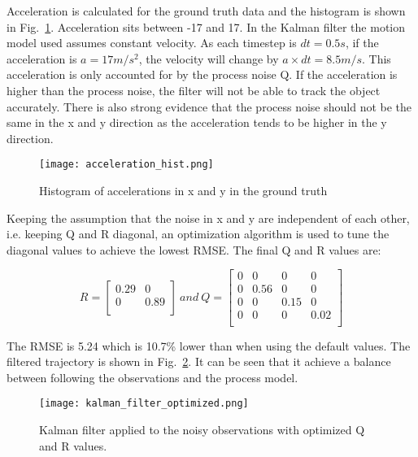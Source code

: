 \documentclass{report}
\begin{document}
Acceleration is calculated for the ground truth data and the histogram is shown in Fig.~\ref{fig:acceleration_hist}. Acceleration sits between -17 and 17. In the Kalman filter the motion model used assumes constant velocity. As each timestep is \(dt=0.5s\), if the acceleration is \(a = 17 m/s^2\), the velocity will change by \(a \times dt = 8.5m/s\). This acceleration is only accounted for by the process noise Q. If the acceleration is higher than the process noise, the filter will not be able to track the object accurately. There is also strong evidence that the process noise should not be the same in the x and y direction as the acceleration tends to be higher in the y direction.

\begin{figure}
    \centering
    \texttt{[image: acceleration\_hist.png]}
    \caption{Histogram of accelerations in x and y in the ground truth}
    \label{fig:acceleration_hist}
\end{figure}

Keeping the assumption that the noise in x and y are independent of each other, i.e. keeping Q and R diagonal, an optimization algorithm is used to tune the diagonal values to achieve the lowest RMSE. The final Q and R values are:

\begin{equation}
R = \begin{bmatrix} 
    0.29 & 0    \\
    0    & 0.89 \\
\end{bmatrix}\ and\ Q = \begin{bmatrix} 
    0 & 0    & 0    & 0    \\
    0 & 0.56 & 0    & 0    \\
    0 & 0    & 0.15 & 0    \\
    0 & 0    & 0    & 0.02 \\
\end{bmatrix}
\end{equation}

The RMSE is 5.24 which is 10.7\% lower than when using the default values. The filtered trajectory is shown in Fig.~\ref{fig:kalman_filter_optimized}. It can be seen that it achieve a balance between following the observations and the process model.

\begin{figure}
    \centering
    \texttt{[image: kalman\_filter\_optimized.png]}
    \caption{Kalman filter applied to the noisy observations with optimized Q and R values.}
    \label{fig:kalman_filter_optimized}
\end{figure}
\end{document}
